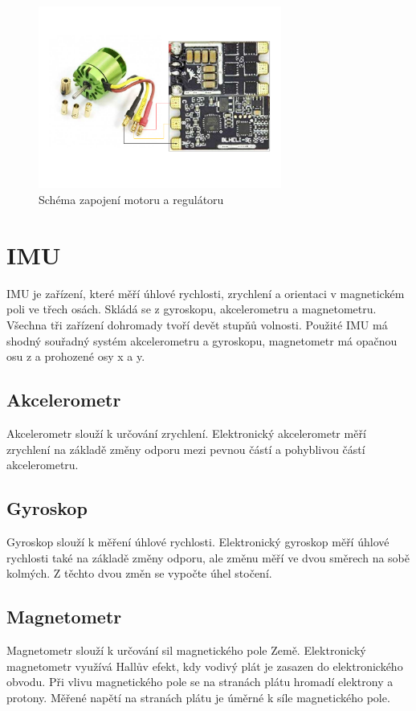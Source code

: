 \begin{figure}[H]
	\centering
	\includegraphics[width=8cm]{pictures/motor.pdf}
	\caption{Schéma zapojení motoru a regulátoru}
\end{figure}

\section{IMU}
IMU je zařízení, které měří úhlové rychlosti, zrychlení a orientaci v magnetickém poli ve třech osách. Skládá se z gyroskopu, akcelerometru a magnetometru. Všechna tři zařízení dohromady tvoří devět stupňů volnosti.  Použité IMU má shodný souřadný systém akcelerometru a gyroskopu, magnetometr má opačnou osu z a prohozené osy x a y.\cite{imu}\\

\subsection{Akcelerometr}
Akcelerometr slouží k určování zrychlení. Elektronický akcelerometr měří zrychlení na základě změny odporu mezi pevnou částí a pohyblivou částí akcelerometru. \\

\subsection{Gyroskop}
Gyroskop slouží k měření úhlové rychlosti.  Elektronický gyroskop měří úhlové rychlosti také na základě změny odporu, ale změnu měří ve dvou směrech na sobě kolmých. Z těchto dvou změn se vypočte úhel stočení.\\

\subsection{Magnetometr}
Magnetometr slouží k určování sil magnetického pole Země. Elektronický magnetometr využívá Hallův efekt, kdy vodivý plát je zasazen do elektronického obvodu. Při vlivu magnetického pole se na stranách plátu hromadí elektrony a protony. Měřené napětí na stranách plátu je úměrné k síle magnetického pole.\\

